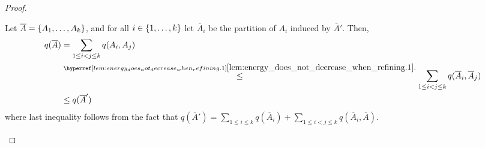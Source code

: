 \begin{lemma}
\begin{proof}
\begin{enumerate}
                        Let $\overline{A} = \{ A_1, \dots, A_k \}$, and for all $i \in \{ 1, \dots, k \}$ let
                        $\overline{A}_i$ be the partition of $A_i$ induced by $\overline{A}'$.
                        Then,
                        \begin{align*}
                            q(\overline{A})
                                & = \sum_{1 \leq i < j \leq k} q(A_i, A_j) \\
                                & \stackrel{\dref{lem:energy_does_not_decrease_when_refining.1}}{\leq}
                                    \sum_{1 \leq i < j \leq k} q(\overline{A}_i, \overline{A}_j) \\
                                & \leq q(\overline{A}')
                        \end{align*}
                        where last inequality follows from the fact that
                        $q(\overline{A}') = \sum_{1 \leq i \leq k} q(\overline{A}_i) + \sum_{1 \leq i < j \leq k} q(\overline{A}_i, \overline{A})$.
                \end{enumerate}
            \end{proof}
        \end{lemma}

